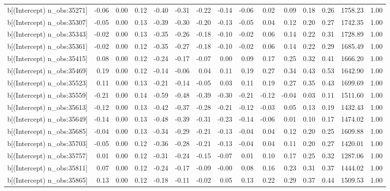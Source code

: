 \begin{table}[ht]
\begin{tabular}{rrrrrrrrrrrrrrr}
  b[(Intercept) n\_obs:35271] & -0.06 & 0.00 & 0.12 & -0.40 & -0.31 & -0.22 & -0.14 & -0.06 & 0.02 & 0.09 & 0.18 & 0.26 & 1758.23 & 1.00 \\ 
  b[(Intercept) n\_obs:35307] & -0.05 & 0.00 & 0.13 & -0.39 & -0.30 & -0.20 & -0.13 & -0.05 & 0.04 & 0.12 & 0.20 & 0.27 & 1742.35 & 1.00 \\ 
  b[(Intercept) n\_obs:35343] & -0.02 & 0.00 & 0.13 & -0.35 & -0.26 & -0.18 & -0.10 & -0.02 & 0.06 & 0.14 & 0.22 & 0.31 & 1728.89 & 1.00 \\ 
  b[(Intercept) n\_obs:35361] & -0.02 & 0.00 & 0.12 & -0.35 & -0.27 & -0.18 & -0.10 & -0.02 & 0.06 & 0.14 & 0.22 & 0.29 & 1685.49 & 1.00 \\ 
  b[(Intercept) n\_obs:35415] & 0.08 & 0.00 & 0.12 & -0.24 & -0.17 & -0.07 & 0.00 & 0.09 & 0.17 & 0.25 & 0.32 & 0.41 & 1666.20 & 1.00 \\ 
  b[(Intercept) n\_obs:35469] & 0.19 & 0.00 & 0.12 & -0.14 & -0.06 & 0.04 & 0.11 & 0.19 & 0.27 & 0.34 & 0.43 & 0.53 & 1642.90 & 1.00 \\ 
  b[(Intercept) n\_obs:35523] & 0.11 & 0.00 & 0.13 & -0.21 & -0.14 & -0.05 & 0.03 & 0.11 & 0.19 & 0.27 & 0.35 & 0.43 & 1699.69 & 1.00 \\ 
  b[(Intercept) n\_obs:35559] & -0.21 & 0.00 & 0.14 & -0.59 & -0.48 & -0.39 & -0.30 & -0.21 & -0.12 & -0.04 & 0.03 & 0.11 & 1511.60 & 1.00 \\ 
  b[(Intercept) n\_obs:35613] & -0.12 & 0.00 & 0.13 & -0.42 & -0.37 & -0.28 & -0.21 & -0.12 & -0.03 & 0.05 & 0.13 & 0.19 & 1432.43 & 1.00 \\ 
  b[(Intercept) n\_obs:35649] & -0.14 & 0.00 & 0.13 & -0.48 & -0.39 & -0.31 & -0.23 & -0.14 & -0.06 & 0.01 & 0.10 & 0.17 & 1474.02 & 1.00 \\ 
  b[(Intercept) n\_obs:35685] & -0.04 & 0.00 & 0.13 & -0.34 & -0.29 & -0.21 & -0.13 & -0.04 & 0.04 & 0.12 & 0.20 & 0.25 & 1609.88 & 1.00 \\ 
  b[(Intercept) n\_obs:35703] & -0.05 & 0.00 & 0.12 & -0.36 & -0.28 & -0.21 & -0.13 & -0.04 & 0.04 & 0.11 & 0.20 & 0.27 & 1420.01 & 1.00 \\ 
  b[(Intercept) n\_obs:35757] & 0.01 & 0.00 & 0.12 & -0.31 & -0.24 & -0.15 & -0.07 & 0.01 & 0.10 & 0.17 & 0.25 & 0.32 & 1287.06 & 1.00 \\ 
  b[(Intercept) n\_obs:35811] & 0.07 & 0.00 & 0.12 & -0.24 & -0.17 & -0.09 & -0.00 & 0.08 & 0.16 & 0.23 & 0.31 & 0.37 & 1444.02 & 1.00 \\ 
  b[(Intercept) n\_obs:35865] & 0.13 & 0.00 & 0.12 & -0.18 & -0.11 & -0.02 & 0.05 & 0.13 & 0.22 & 0.29 & 0.37 & 0.44 & 1509.53 & 1.00 \\ 

\end{tabular}
\end{table}
